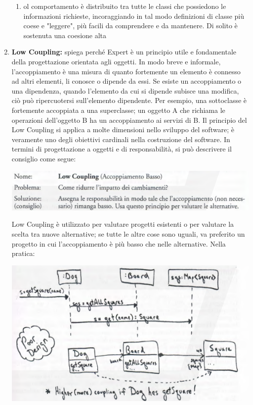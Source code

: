 \documentclass[a4paper,12pt, oneside]{book}
\begin{document}
\begin{enumerate}
\begin{enumerate}
\item ol comportamento è distribuito tra tutte le classi che possiedono le informazioni
richieste, incoraggiando in tal modo definizioni di classe più coese e "leggere", più
facili da comprendere e da mantenere. Di solito è sostenuta una coesione alta
\end{enumerate}
\item \textbf{Low Coupling:} spiega perché Expert è un principio utile
e fondamentale della progettazione orientata agli oggetti. In modo
breve e informale, l'accoppiamento è una misura di quanto fortemente un elemento
è connesso ad altri elementi, li conosce o dipende da essi. Se esiste un accoppiamento
o una dipendenza, quando l'elemento da cui si dipende subisce una modifica, ciò può
ripercuotersi sull'elemento dipendente. Per esempio, una sottoclasse è fortemente accoppiata a una superclasse; un oggetto A che richiama le operazioni dell'oggetto B ha un
accoppiamento ai servizi di B.
Il principio del Low Coupling si applica a molte dimensioni nello sviluppo del software;
è veramente uno degli obiettivi cardinali nella costruzione del software. In termini di
progettazione a oggetti e di responsabilità, si può descrivere il consiglio come segue:
\begin{center}
\includegraphics[scale = 0.7]{img/grasp8.png}
\end{center}
Low Coupling è utilizzato per valutare progetti esistenti o per valutare la scelta
tra nuove alternative; se tutte le altre cose sono uguali, va preferito un progetto in cui l'accoppiamento è più basso che nelle alternative. Nella pratica:
\begin{center}
\includegraphics[scale = 0.7]{img/grasp9.png}

\end{center}
\end{enumerate}
\end{document}
